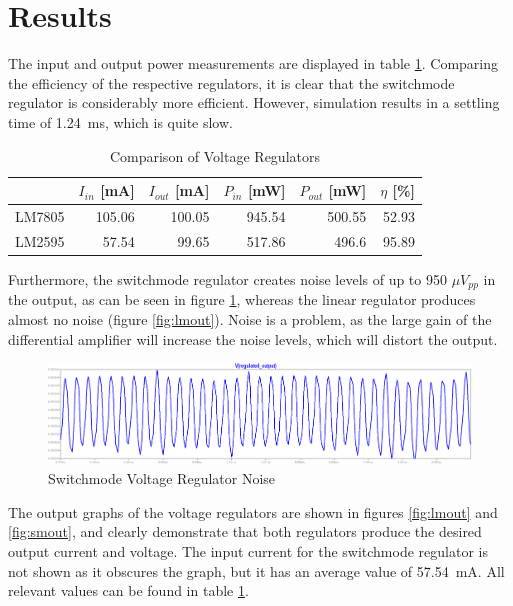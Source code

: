 \section{Results} \label{sec:volt_results}

The input and output power measurements are displayed in table \ref{tab:compvreg}. Comparing the efficiency of the respective regulators, it is clear that the switchmode regulator is considerably more efficient. However, simulation results in a settling time of \SI{1.24}{ms}, which is quite slow. 

\begin{table}
        \centering
        \footnotesize
        \caption{Comparison of Voltage Regulators}
         \begin{tabular}{c@{\qquad}rrrrr}
          \toprule
             & $I_{in}$ [mA] & $I_{out}$ [mA] & $P_{in}$ [mW] & $P_{out}$ [mW] & $\eta$ [\%] \\
          \midrule
          LM7805 	& 105.06 	& 100.05 	& 945.54 	& 500.55 	& 52.93\\
          LM2595 	& 57.54 	& 99.65 	& 517.86 	& 496.6 	& 95.89\\
          \bottomrule
        \end{tabular}
     \label{tab:compvreg}
\end{table}

Furthermore, the switchmode regulator creates noise levels of up to 950 $\mu V_{pp}$ in the output, as can be seen in figure \ref{fig:smnoise}, whereas the linear regulator produces almost no noise (figure \ref{fig:lmout}). Noise is a problem, as the large gain of the differential amplifier  will increase the noise levels, which will distort the output. 

\begin{figure}[h]
    \centering
    \includegraphics[width = 1\textwidth]{Figures/smnoise.png}
    \caption{Switchmode Voltage Regulator Noise}
    \label{fig:smnoise}
\end{figure}


The output graphs of the voltage regulators are shown in figures \ref{fig:lmout} and \ref{fig:smout}, and clearly demonstrate that both regulators produce the desired output current and voltage. The input current for the switchmode regulator is not shown as it obscures the graph, but it has an average value of \SI{57.54}{mA}. All relevant values can be found in table \ref{tab:compvreg}.

